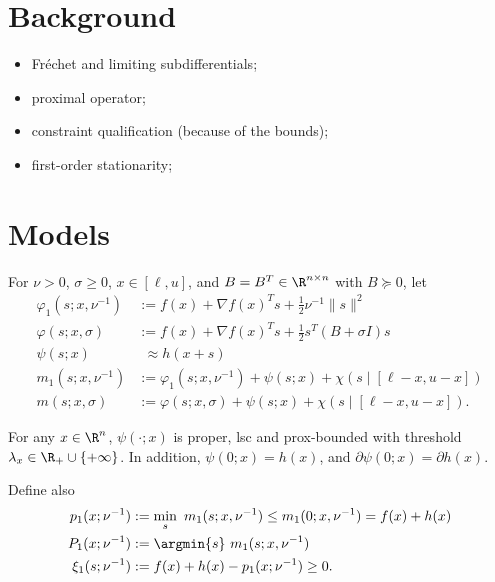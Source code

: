 \documentclass[smallextended]{svjour3}       %
\begin{document}
\section{Background}%
\label{sec:background}

\begin{itemize}
  \item Fréchet and limiting subdifferentials;
  \item proximal operator;
  \item constraint qualification (because of the bounds);
  \item first-order stationarity;
\end{itemize}

\section{Models}%
\label{sec:models}

For \(\nu > 0\), \(\sigma \geq 0\), \(x \in [\ell, u]\), and \(B = B^T \in \R^{n \times n}\) with \(B \succeq 0\), let
\begin{subequations}
  \begin{align}
    \varphi_1(s; x, \nu^{-1}) & := f(x) + \nabla f(x)^T s + \tfrac{1}{2} \nu^{-1} \|s\|^2 \\
    \varphi(s; x, \sigma)     & := f(x) + \nabla f(x)^T s + \tfrac{1}{2} s^T (B + \sigma I) s \\
    \psi(s; x)                & \phantom{:}\approx h(x + s) \\
    m_1(s; x, \nu^{-1})       & := \varphi_1(s; x, \nu^{-1}) + \psi(s; x) + \chi(s \mid [\ell - x, u - x]) \\
    m(s; x, \sigma)           & := \varphi(s; x, \sigma) + \psi(s; x) + \chi(s \mid [\ell - x, u - x]).
  \end{align}
\end{subequations}

\begin{modelassumption}%
  \label{asm:psi}
  For any \(x \in \R^n\), \(\psi(\cdot; x)\) is proper, lsc and prox-bounded with threshold \(\lambda_x \in \R_+ \cup \{+\infty\}\).
  In addition, \(\psi(0; x) = h(x)\), and \(\partial \psi(0; x) = \partial h(x)\).
\end{modelassumption}

Define also
\begin{subequations}
  \begin{align}
    p_1(x; \nu^{-1})   & := \min_s \ m_1(s; x, \nu^{-1}) \leq m_1(0; x, \nu^{-1}) = f(x) + h(x) \\
    P_1(x; \nu^{-1})   & := \argmin{s} \ m_1(s; x, \nu^{-1}) \\
    \xi_1(s; \nu^{-1}) & := f(x) + h(x) - p_1(x; \nu^{-1}) \geq 0 \label{eq:def-xi1}.
  \end{align}
\end{subequations}
\end{document}
